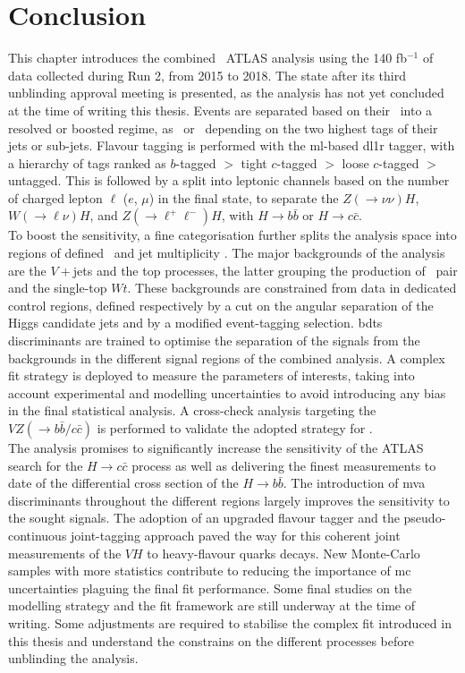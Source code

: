 \section{Conclusion}
This chapter introduces the combined \vhbc\ ATLAS analysis using the 140 fb$^{-1}$ of data collected during Run 2, from 2015 to 2018. The state after its third unblinding approval meeting is presented, as the analysis has not yet concluded at the time of writing this thesis. Events are separated based on their \ptv\ into a resolved or boosted regime, as \vhb\ or \vhc\ depending on the two highest tags of their jets or sub-jets. Flavour tagging is performed with the \gls{ml}-based \gls{dl1r} tagger, with a hierarchy of tags ranked as $b$-tagged $>$ tight $c$-tagged $>$ loose $c$-tagged $>$ untagged. This is followed by a split into leptonic channels based on the number of charged lepton $\ell$ ($e$, $\mu$) in the final state, to separate the $Z(\rightarrow \nu\nu)H$, $W(\rightarrow \ell\nu)H$, and $Z(\rightarrow \ell^+\ell^-)H$, with $H \rightarrow b\bar{b}$ or $H \rightarrow c\bar{c}$. \\

To boost the sensitivity, a fine categorisation further splits the analysis space into regions of defined \ptv\ and jet multiplicity \nj. The major backgrounds of the analysis are the $V+$jets and the top processes, the latter grouping the production of \ttb\ pair and the single-top $Wt$. These backgrounds are constrained from data in dedicated control regions, defined respectively by a cut on the angular separation of the Higgs candidate jets and by a modified event-tagging selection. \glspl{bdt} discriminants are trained to optimise the separation of the signals from the backgrounds in the different signal regions of the combined analysis. A complex fit strategy is deployed to measure the parameters of interests, taking into account experimental and modelling uncertainties to avoid introducing any bias in the final statistical analysis. A cross-check analysis targeting the $VZ (\rightarrow b\bar{b}/c\bar{c})$ is performed to validate the adopted strategy for \vhbc. \\

The analysis promises to significantly increase the sensitivity of the ATLAS search for the $H\rightarrow c\bar{c}$ process as well as delivering the finest measurements to date of the differential cross section of the $H\rightarrow b\bar{b}$. The introduction of \gls{mva} discriminants throughout the different regions largely improves the sensitivity to the sought signals. The adoption of an upgraded flavour tagger and the pseudo-continuous joint-tagging approach paved the way for this coherent joint measurements of the $VH$ to heavy-flavour quarks decays. New Monte-Carlo samples with more statistics contribute to reducing the importance of \gls{mc} uncertainties plaguing the final fit performance. Some final studies on the modelling strategy and the fit framework are still underway at the time of writing. Some adjustments are required to stabilise the complex fit introduced in this thesis and understand the constrains on the different processes before unblinding the analysis.\\

